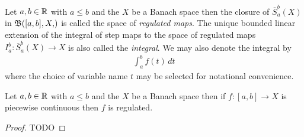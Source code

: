 \begin{defn}Let $a,b \in \mathbb{R}$ with $a \leq b$ and the $X$ be a Banach space then the closure of $\overline{S}_a^b(X)$ in $\sboundedfunctions{[a,b], X}$
  is called the space of \emph{regulated maps}.   The unique bounded linear extension of the integral of step maps to the space of regulated maps $I_a^b : \overline{S}_a^b(X) \to X$
  is also called the \emph{integral}.   We may also denote the integral by
  \begin{align*}
    \int_a^b f(t) \, dt
  \end{align*}
  where the choice of variable name $t$ may be selected for notational convenience.
\end{defn}

\begin{prop}\label{banach:PiecewiseContinuousIsRegulated}Let $a,b \in \mathbb{R}$ with $a \leq b$ and the $X$ be a Banach space  then if $f : [a,b] \to X$ is piecewise continuous then $f$ is regulated.
\end{prop}
\begin{proof}
  TODO
\end{proof}

